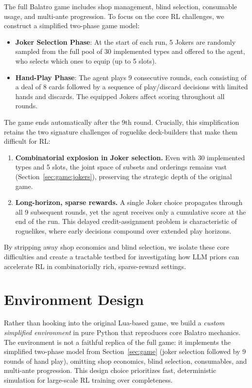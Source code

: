 \documentclass[conference]{IEEEtran}
\begin{document}
The full Balatro game includes shop management, blind selection, consumable usage, and multi-ante progression.
To focus on the core RL challenges, we construct a simplified two-phase game model:
\begin{itemize}
    \item \textbf{Joker Selection Phase}: At the start of each run, 5 Jokers are randomly sampled from the full pool of 30 implemented types and offered to the agent, who selects which ones to equip (up to 5 slots).
    \item \textbf{Hand-Play Phase}: The agent plays 9 consecutive rounds, each consisting of a deal of 8 cards followed by a sequence of play/discard decisions with limited hands and discards. The equipped Jokers affect scoring throughout all rounds.
\end{itemize}
The game ends automatically after the 9th round.
Crucially, this simplification retains the two signature challenges of roguelike deck-builders that make them difficult for RL:
\begin{enumerate}
    \item \textbf{Combinatorial explosion in Joker selection.} Even with 30 implemented types and 5 slots, the joint space of subsets and orderings remains vast (Section~\ref{sec:game:jokers}), preserving the strategic depth of the original game.
    \item \textbf{Long-horizon, sparse rewards.} A single Joker choice propagates through all 9 subsequent rounds, yet the agent receives only a cumulative score at the end of the run. This delayed credit-assignment problem is characteristic of roguelikes, where early decisions compound over extended play horizons.
\end{enumerate}
By stripping away shop economics and blind selection, we isolate these core difficulties and create a tractable testbed for investigating how LLM priors can accelerate RL in combinatorially rich, sparse-reward settings.

\section{Environment Design}
\label{sec:env}

Rather than hooking into the original Lua-based game, we build a \textit{custom simplified environment} in pure Python that reproduces core Balatro mechanics.
The environment is not a faithful replica of the full game: it implements the simplified two-phase model from Section~\ref{sec:game} (joker selection followed by 9 rounds of hand play), omitting shop economics, blind selection, consumables, and multi-ante progression.
This design choice prioritizes fast, deterministic simulation for large-scale RL training over completeness.
\end{document}
